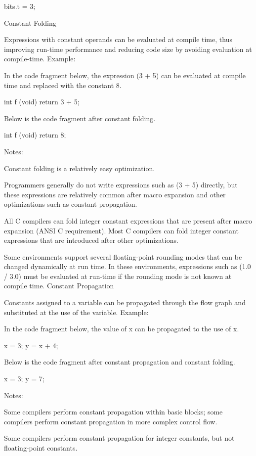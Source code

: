 {{{{{{{{{{    bits.t = 3;

Constant Folding

Expressions with constant operands can be evaluated at compile time, thus improving run-time performance and reducing code size by avoiding evaluation at compile-time.
Example:

In the code fragment below, the expression (3 + 5) can be evaluated at compile time and replaced with the constant 8.

    int f (void)
    {
      return 3 + 5;
    }

Below is the code fragment after constant folding.

    int f (void)
    {
      return 8;
    }

Notes:

Constant folding is a relatively easy optimization.

Programmers generally do not write expressions such as (3 + 5) directly, but these expressions are relatively common after macro expansion and other optimizations such as constant propagation.

All C compilers can fold integer constant expressions that are present after macro expansion (ANSI C requirement). Most C compilers can fold integer constant expressions that are introduced after other optimizations.

Some environments support several floating-point rounding modes that can be changed dynamically at run time. In these environments, expressions such as (1.0 / 3.0) must be evaluated at run-time if the rounding mode is not known at compile time. 
Constant Propagation

Constants assigned to a variable can be propagated through the flow graph and substituted at the use of the variable.
Example:

In the code fragment below, the value of x can be propagated to the use of x.

    x = 3;
    y = x + 4;

Below is the code fragment after constant propagation and constant folding.

    x = 3;
    y = 7;

Notes:

Some compilers perform constant propagation within basic blocks; some compilers perform constant propagation in more complex control flow.

Some compilers perform constant propagation for integer constants, but not floating-point constants.

}}}}}}}}}}
